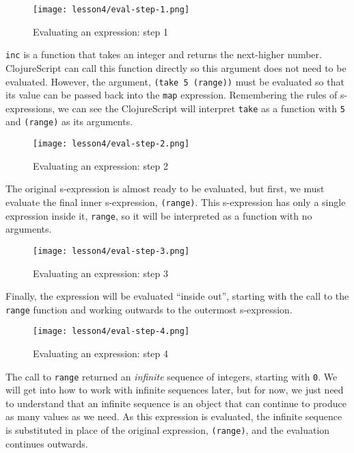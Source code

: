 \documentclass[10pt,twoside,openright]{memoir}
\begin{document}
\begin{figure}[H]
\caption{Evaluating an expression: step 1}
\centering
\texttt{[image: lesson4/eval-step-1.png]}
\end{figure}

\texttt{inc} is a function that takes an integer and returns the
next-higher number. ClojureScript can call this function directly so
this argument does not need to be evaluated. However, the argument,
\texttt{(take\ 5\ (range))} must be evaluated so that its value can be
passed back into the \texttt{map} expression. Remembering the rules of
s-expressions, we can see the ClojureScript will interpret \texttt{take}
as a function with \texttt{5} and \texttt{(range)} as its arguments.

\begin{figure}[H]
\caption{Evaluating an expression: step 2}
\centering
\texttt{[image: lesson4/eval-step-2.png]}
\end{figure}

The original s-expression is almost ready to be evaluated, but first, we
must evaluate the final inner s-expression, \texttt{(range)}. This
s-expression has only a single expression inside it, \texttt{range}, so
it will be interpreted as a function with no arguments.

\begin{figure}[H]
\caption{Evaluating an expression: step 3}
\centering
\texttt{[image: lesson4/eval-step-3.png]}
\end{figure}

Finally, the expression will be evaluated ``inside out'', starting with
the call to the \texttt{range} function and working outwards to the
outermost s-expression.

\begin{figure}[H]
\caption{Evaluating an expression: step 4}
\centering
\texttt{[image: lesson4/eval-step-4.png]}
\end{figure}

The call to \texttt{range} returned an \emph{infinite} sequence of
integers, starting with \texttt{0}. We will get into how to work with
infinite sequences later, but for now, we just need to understand that
an infinite sequence is an object that can continue to produce as many
values as we need. As this expression is evaluated, the infinite
sequence is substituted in place of the original expression,
\texttt{(range)}, and the evaluation continues outwards.
\end{document}
